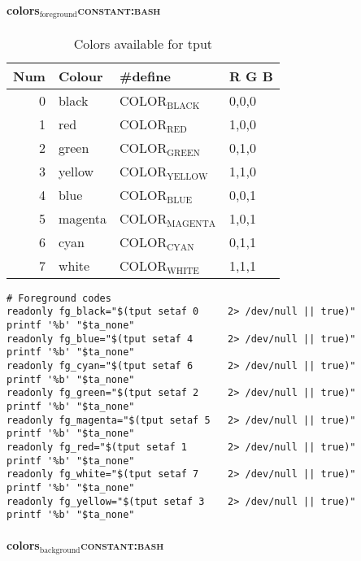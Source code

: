 \documentclass[11pt]{article}
\begin{document}
\paragraph{colors\(_{\text{foreground}}\)\hfill{}\textsc{constant:bash}}
\label{sec:org6059b43}

\begin{table}[htbp]
\caption{Colors available for tput}
\centering
\begin{tabular}{rlll}
\hline
Num & Colour & \#define & R G B\\
\hline
0 & black & COLOR\(_{\text{BLACK}}\) & 0,0,0\\
1 & red & COLOR\(_{\text{RED}}\) & 1,0,0\\
2 & green & COLOR\(_{\text{GREEN}}\) & 0,1,0\\
3 & yellow & COLOR\(_{\text{YELLOW}}\) & 1,1,0\\
4 & blue & COLOR\(_{\text{BLUE}}\) & 0,0,1\\
5 & magenta & COLOR\(_{\text{MAGENTA}}\) & 1,0,1\\
6 & cyan & COLOR\(_{\text{CYAN}}\) & 0,1,1\\
7 & white & COLOR\(_{\text{WHITE}}\) & 1,1,1\\
\hline
\end{tabular}
\end{table}

\begin{verbatim}
# Foreground codes
readonly fg_black="$(tput setaf 0     2> /dev/null || true)"
printf '%b' "$ta_none"
readonly fg_blue="$(tput setaf 4      2> /dev/null || true)"
printf '%b' "$ta_none"
readonly fg_cyan="$(tput setaf 6      2> /dev/null || true)"
printf '%b' "$ta_none"
readonly fg_green="$(tput setaf 2     2> /dev/null || true)"
printf '%b' "$ta_none"
readonly fg_magenta="$(tput setaf 5   2> /dev/null || true)"
printf '%b' "$ta_none"
readonly fg_red="$(tput setaf 1       2> /dev/null || true)"
printf '%b' "$ta_none"
readonly fg_white="$(tput setaf 7     2> /dev/null || true)"
printf '%b' "$ta_none"
readonly fg_yellow="$(tput setaf 3    2> /dev/null || true)"
printf '%b' "$ta_none"
\end{verbatim}

\paragraph{colors\(_{\text{background}}\)\hfill{}\textsc{constant:bash}}
\label{sec:org3bcc3a6}
\end{document}
